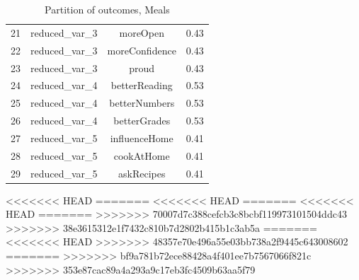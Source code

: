 \documentclass[12pt, a4paper, titlepage]{article}\usepackage[]{graphicx}\usepackage[]{color}
\begin{document}
\begin{table}[ht]
\begin{tabular}{lccc}
  21 & reduced\_var\_3 & moreOpen & 0.43 \\ 
  22 & reduced\_var\_3 & moreConfidence & 0.43 \\ 
  23 & reduced\_var\_3 & proud & 0.43 \\ 
  24 & reduced\_var\_4 & betterReading & 0.53 \\ 
  25 & reduced\_var\_4 & betterNumbers & 0.53 \\ 
  26 & reduced\_var\_4 & betterGrades & 0.53 \\ 
  27 & reduced\_var\_5 & influenceHome & 0.41 \\ 
  28 & reduced\_var\_5 & cookAtHome & 0.41 \\ 
  29 & reduced\_var\_5 & askRecipes & 0.41 \\ 
   \hline
\end{tabular}
\caption{Partition of outcomes, Meals} 
\label{partitionmeals}
\end{table}
<<<<<<< HEAD
=======
<<<<<<< HEAD
=======
<<<<<<< HEAD
=======
>>>>>>> 70007d7c388cefcb3c8bcbf119973101504ddc43
>>>>>>> 38e3615312e1f7432c810b7d2802b415b1c3ab5a
=======
<<<<<<< HEAD
>>>>>>> 48357e70e496a55e03bb738a2f9445c643008602
=======
>>>>>>> bf9a781b72ece88428a4f401ee7b7567066f821c
>>>>>>> 353e87cac89a4a293a9c17eb3fc4509b63aa5f79
\end{document}
